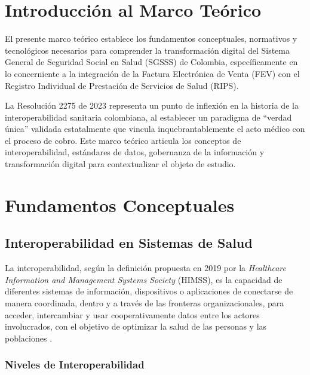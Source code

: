 \documentclass[12pt,letterpaper]{report}
\begin{document}
\section{Introducción al Marco Teórico}
El presente marco teórico establece los fundamentos conceptuales, normativos y tecnológicos necesarios para comprender la transformación digital del Sistema General de Seguridad Social en Salud (SGSSS) de Colombia, específicamente en lo concerniente a la integración de la Factura Electrónica de Venta (FEV) con el Registro Individual de Prestación de Servicios de Salud (RIPS).

La Resolución 2275 de 2023 representa un punto de inflexión en la historia de la interoperabilidad sanitaria colombiana, al establecer un paradigma de ``verdad única'' validada estatalmente que vincula inquebrantablemente el acto médico con el proceso de cobro. Este marco teórico articula los conceptos de interoperabilidad, estándares de datos, gobernanza de la información y transformación digital para contextualizar el objeto de estudio.

\section{Fundamentos Conceptuales}

\subsection{Interoperabilidad en Sistemas de Salud}

\begin{definicion}[Interoperabilidad]
La interoperabilidad, según la definición propuesta en 2019 por la \textit{Healthcare Information and Management Systems Society} (HIMSS), es la capacidad de diferentes sistemas de información, dispositivos o aplicaciones de conectarse de manera coordinada, dentro y a través de las fronteras organizacionales, para acceder, intercambiar y usar cooperativamente datos entre los actores involucrados, con el objetivo de optimizar la salud de las personas y las poblaciones \cite{sullivan2019himss}.
\end{definicion}

\subsubsection{Niveles de Interoperabilidad}
\end{document}
